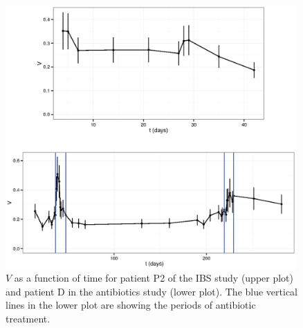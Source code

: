 \begin{figure}
	\centering 
	\includegraphics[width=0.99\textwidth]{figs/Fig7.eps}	
\caption{$V$ as a function of time for patient P2 of the IBS study\cite{IBS} (upper plot) and patient D in the antibiotics study\cite{antibiotic} (lower plot). The blue vertical lines in the lower plot are showing the periods of antibiotic treatment.}
\label{fig:tempevo2}
\end{figure}
